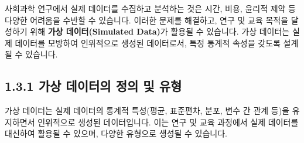 \documentclass[
  letterpaper,
]{book}
\begin{document}
사회과학 연구에서 실제 데이터를 수집하고 분석하는 것은 시간, 비용,
윤리적 제약 등 다양한 어려움을 수반할 수 있습니다. 이러한 문제를
해결하고, 연구 및 교육 목적을 달성하기 위해 \textbf{가상
데이터(Simulated Data)}가 활용될 수 있습니다. 가상 데이터는 실제
데이터를 모방하여 인위적으로 생성된 데이터로서, 특정 통계적 속성을
갖도록 설계될 수 있습니다.

\subsection{1.3.1 가상 데이터의 정의 및
유형}\label{uxac00uxc0c1-uxb370uxc774uxd130uxc758-uxc815uxc758-uxbc0f-uxc720uxd615}

가상 데이터는 실제 데이터의 통계적 특성(평균, 표준편차, 분포, 변수 간
관계 등)을 유지하면서 인위적으로 생성된 데이터입니다. 이는 연구 및 교육
과정에서 실제 데이터를 대신하여 활용될 수 있으며, 다양한 유형으로 생성될
수 있습니다.
\end{document}
